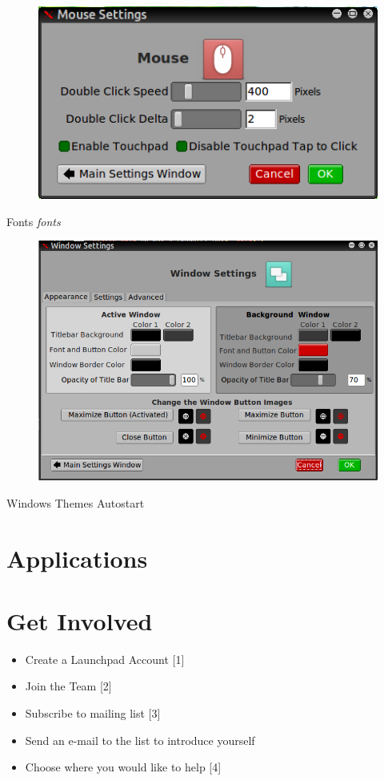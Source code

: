 \documentclass[12pt,a4paper]{book}
\begin{document}
\begin{figure}
\centering
\includegraphics[width=0.7\linewidth]{./mouse-settings}
\caption{}
\label{fig:mouse-settings}
\end{figure}

{Fonts}
\textit{fonts}

\begin{figure}
\centering
\includegraphics[width=0.7\linewidth]{./window-settings}
\caption{}
\label{fig:window-settings}
\end{figure}


{Windows}
{Themes}
{Autostart}


\chapter{Applications}

\chapter{Get Involved}

\begin{itemize}
\item{Create a Launchpad Account [1]}
\item{Join the Team [2]}
\item{Subscribe to mailing list [3]}
\item{Send an e-mail to the list to introduce yourself}
\item{Choose where you would like to help [4]}
\end{itemize}
\end{document}
